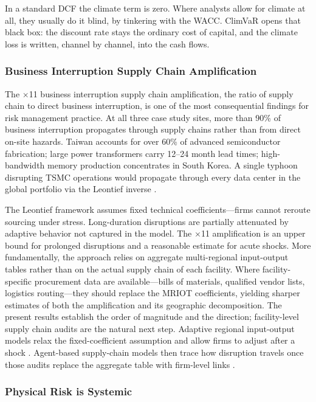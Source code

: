 \begin{twocolbody}
In a standard DCF the climate term is zero. Where analysts allow for climate at all, they usually do it blind, by tinkering with the WACC. ClimVaR opens that black box: the discount rate stays the ordinary cost of capital, and the climate loss is written, channel by channel, into the cash flows.

\subsubsection*{Business Interruption Supply Chain Amplification}

The $\times$11 business interruption supply chain amplification, the ratio of supply chain to direct business interruption, is one of the most consequential findings for risk management practice. At all three case study sites, more than 90\% of business interruption propagates through supply chains rather than from direct on-site hazards. Taiwan accounts for over 60\% of advanced semiconductor fabrication; large power transformers carry 12--24 month lead times; high-bandwidth memory production concentrates in South Korea. A single typhoon disrupting TSMC operations would propagate through every data center in the global portfolio via the Leontief inverse \citep{verdantix2024}.

The Leontief framework assumes fixed technical coefficients---firms cannot reroute sourcing under stress. Long-duration disruptions are partially attenuated by adaptive behavior not captured in the model. The $\times$11 amplification is an upper bound for prolonged disruptions and a reasonable estimate for acute shocks. More fundamentally, the approach relies on aggregate multi-regional input-output tables rather than on the actual supply chain of each facility. Where facility-specific procurement data are available---bills of materials, qualified vendor lists, logistics routing---they should replace the MRIOT coefficients, yielding sharper estimates of both the amplification and its geographic decomposition. The present results establish the order of magnitude and the direction; facility-level supply chain audits are the natural next step. Adaptive regional input-output models relax the fixed-coefficient assumption and allow firms to adjust after a shock \citep{hallegatte2008ario}. Agent-based supply-chain models then trace how disruption travels once those audits replace the aggregate table with firm-level links \citep{colon2021supply}.

\subsubsection*{Physical Risk is Systemic}


\end{twocolbody}
